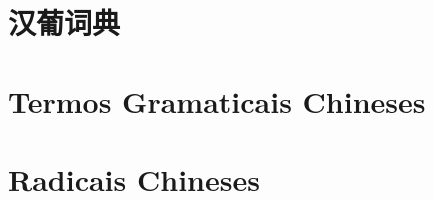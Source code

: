 \documentclass[a4paper,10pt,twoside,openany]{memoir}
\begin{document}


\newpage
\tableofcontents

\newpage
\chapter{汉葡词典}

%
%
%

\newpage
\begin{multicols}{2}























\end{multicols}

\newpage
\pagestyle{plain}
\chapter{Termos Gramaticais Chineses}


\newpage
\chapter{Radicais Chineses}


\printindex[stroke]
\printindex[radical]
\printindex[pinyin]
\end{document}
